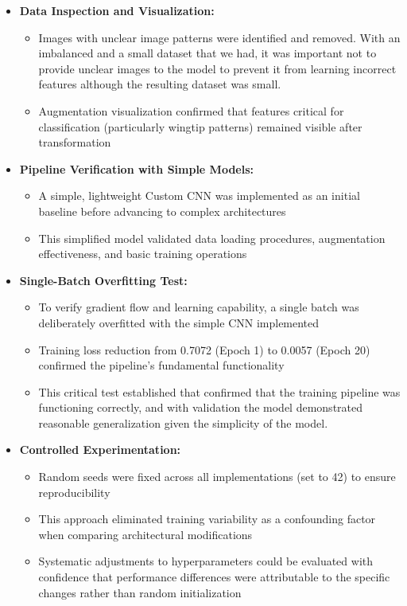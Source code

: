 \documentclass[a4paper,12pt]{report}
\begin{document}
\begin{itemize}
    \item \textbf{Data Inspection and Visualization:}
    \begin{itemize}
        \item Images with unclear image patterns were identified and removed. With an imbalanced and a small dataset that we had, it was important not to provide unclear images to the model to prevent it from learning incorrect features although the resulting dataset was small.
        \item Augmentation visualization confirmed that features critical for classification (particularly wingtip patterns) remained visible after transformation
    \end{itemize}
    
    \item \textbf{Pipeline Verification with Simple Models:}
    \begin{itemize}
        \item A simple, lightweight Custom CNN was implemented as an initial baseline before advancing to complex architectures
        \item This simplified model validated data loading procedures, augmentation effectiveness, and basic training operations
    \end{itemize}
    
    \item \textbf{Single-Batch Overfitting Test:}
    \begin{itemize}
        \item To verify gradient flow and learning capability, a single batch was deliberately overfitted with the simple CNN implemented
        \item Training loss reduction from 0.7072 (Epoch 1) to 0.0057 (Epoch 20) confirmed the pipeline's fundamental functionality
        \item This critical test established that confirmed that the training pipeline was functioning correctly, and with validation the model demonstrated reasonable generalization given the simplicity of the model.
    \end{itemize}
    
    \item \textbf{Controlled Experimentation:}
    \begin{itemize}
        \item Random seeds were fixed across all implementations (set to 42) to ensure reproducibility
        \item This approach eliminated training variability as a confounding factor when comparing architectural modifications
        \item Systematic adjustments to hyperparameters could be evaluated with confidence that performance differences were attributable to the specific changes rather than random initialization
    \end{itemize}
\end{itemize}
    
\end{document}
